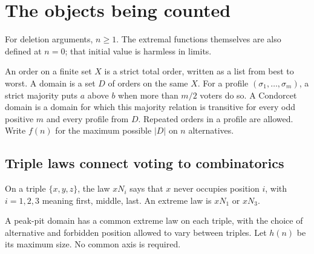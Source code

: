 \section{The objects being counted}\label{sec:definitions}
For deletion arguments, \(n\geq1\). The extremal functions themselves
are also defined at \(n=0\); that initial value is harmless in limits.
\begin{definition}\label{def:semantic}
An order on a finite set \(X\) is a strict total order, written as a list
from best to worst. A domain is a set \(D\) of orders on the same \(X\).
For a profile \((\sigma_1,\ldots,\sigma_m)\), a strict majority puts
\(a\) above \(b\) when more than \(m/2\) voters do so. A Condorcet
domain is a domain for which this majority relation is transitive for
every odd positive \(m\) and every profile from \(D\). Repeated orders
in a profile are allowed. Write \(f(n)\) for the maximum possible
\(|D|\) on \(n\) alternatives.
\end{definition}

\subsection{Triple laws connect voting to combinatorics}
On a triple \(\{x,y,z\}\), the law \(xN_i\) says that \(x\) never
occupies position \(i\), with \(i=1,2,3\) meaning first, middle, last.
An extreme law is \(xN_1\) or \(xN_3\).
\begin{definition}\label{def:peak}
A peak-pit domain has a common extreme law on each triple, with the
choice of alternative and forbidden position allowed to vary between
triples. Let \(h(n)\) be its maximum size. No common axis is required.
\end{definition}

